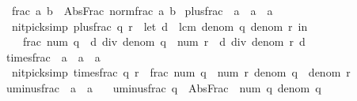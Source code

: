 \begin{isabellebody}
\ \ {\isachardoublequoteopen}frac\ a\ b\ {\isasymequiv}\ Abs{\isacharunderscore}{\kern0pt}Frac\ {\isacharparenleft}{\kern0pt}norm{\isacharunderscore}{\kern0pt}frac\ a\ b{\isacharparenright}{\kern0pt}{\isachardoublequoteclose}\isanewline
\isanewline
{}\isamarkupfalse%
\ plus{\isacharunderscore}{\kern0pt}frac\ {\isacharcolon}{\kern0pt}{\isacharcolon}{\kern0pt}\ {\isachardoublequoteopen}{\isacharprime}{\kern0pt}a\ {\isasymRightarrow}\ {\isacharprime}{\kern0pt}a\ {\isasymRightarrow}\ {\isacharprime}{\kern0pt}a{\isachardoublequoteclose}\ \isanewline
\ \ {\isacharbrackleft}{\kern0pt}nitpick{\isacharunderscore}{\kern0pt}simp{\isacharbrackright}{\kern0pt}{\isacharcolon}{\kern0pt}\ {\isachardoublequoteopen}plus{\isacharunderscore}{\kern0pt}frac\ q\ r\ {\isacharequal}{\kern0pt}\ {\isacharparenleft}{\kern0pt}let\ d\ {\isacharequal}{\kern0pt}\ lcm\ {\isacharparenleft}{\kern0pt}denom\ q{\isacharparenright}{\kern0pt}\ {\isacharparenleft}{\kern0pt}denom\ r{\isacharparenright}{\kern0pt}\ in\isanewline
\ \ \ \ frac\ {\isacharparenleft}{\kern0pt}num\ q\ {\isacharasterisk}{\kern0pt}\ {\isacharparenleft}{\kern0pt}d\ div\ denom\ q{\isacharparenright}{\kern0pt}\ {\isacharplus}{\kern0pt}\ num\ r\ {\isacharasterisk}{\kern0pt}\ {\isacharparenleft}{\kern0pt}d\ div\ denom\ r{\isacharparenright}{\kern0pt}{\isacharparenright}{\kern0pt}\ d{\isacharparenright}{\kern0pt}{\isachardoublequoteclose}\isanewline
\isanewline
{}\isamarkupfalse%
\ times{\isacharunderscore}{\kern0pt}frac\ {\isacharcolon}{\kern0pt}{\isacharcolon}{\kern0pt}\ {\isachardoublequoteopen}{\isacharprime}{\kern0pt}a\ {\isasymRightarrow}\ {\isacharprime}{\kern0pt}a\ {\isasymRightarrow}\ {\isacharprime}{\kern0pt}a{\isachardoublequoteclose}\ \isanewline
\ \ {\isacharbrackleft}{\kern0pt}nitpick{\isacharunderscore}{\kern0pt}simp{\isacharbrackright}{\kern0pt}{\isacharcolon}{\kern0pt}\ {\isachardoublequoteopen}times{\isacharunderscore}{\kern0pt}frac\ q\ r\ {\isacharequal}{\kern0pt}\ frac\ {\isacharparenleft}{\kern0pt}num\ q\ {\isacharasterisk}{\kern0pt}\ num\ r{\isacharparenright}{\kern0pt}\ {\isacharparenleft}{\kern0pt}denom\ q\ {\isacharasterisk}{\kern0pt}\ denom\ r{\isacharparenright}{\kern0pt}{\isachardoublequoteclose}\isanewline
\isanewline
{}\isamarkupfalse%
\ uminus{\isacharunderscore}{\kern0pt}frac\ {\isacharcolon}{\kern0pt}{\isacharcolon}{\kern0pt}\ {\isachardoublequoteopen}{\isacharprime}{\kern0pt}a\ {\isasymRightarrow}\ {\isacharprime}{\kern0pt}a{\isachardoublequoteclose}\ \isanewline
\ \ {\isachardoublequoteopen}uminus{\isacharunderscore}{\kern0pt}frac\ q\ {\isasymequiv}\ Abs{\isacharunderscore}{\kern0pt}Frac\ {\isacharparenleft}{\kern0pt}{\isacharminus}{\kern0pt}\ num\ q{\isacharcomma}{\kern0pt}\ denom\ q{\isacharparenright}{\kern0pt}{\isachardoublequoteclose}\isanewline

\end{isabellebody}
